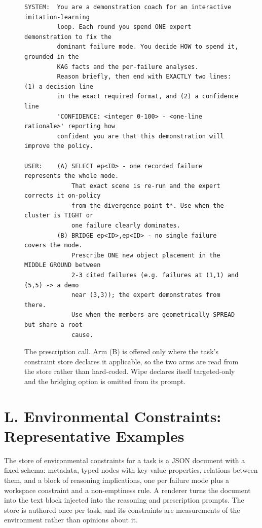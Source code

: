\documentclass[letterpaper]{article}
\begin{document}
\begin{figure}[t]
\centering
\begin{minipage}{\textwidth}
\begin{verbatim}
SYSTEM:  You are a demonstration coach for an interactive imitation-learning
         loop. Each round you spend ONE expert demonstration to fix the
         dominant failure mode. You decide HOW to spend it, grounded in the
         KAG facts and the per-failure analyses.
         Reason briefly, then end with EXACTLY two lines: (1) a decision line
         in the exact required format, and (2) a confidence line
         'CONFIDENCE: <integer 0-100> - <one-line rationale>' reporting how
         confident you are that this demonstration will improve the policy.

USER:    (A) SELECT ep<ID> - one recorded failure represents the whole mode.
             That exact scene is re-run and the expert corrects it on-policy
             from the divergence point t*. Use when the cluster is TIGHT or
             one failure clearly dominates.
         (B) BRIDGE ep<ID>,ep<ID> - no single failure covers the mode.
             Prescribe ONE new object placement in the MIDDLE GROUND between
             2-3 cited failures (e.g. failures at (1,1) and (5,5) -> a demo
             near (3,3)); the expert demonstrates from there.
             Use when the members are geometrically SPREAD but share a root
             cause.
\end{verbatim}
\end{minipage}
\caption{The prescription call. Arm (B) is offered only where the task's constraint
store declares it applicable, so the two arms are read from the store rather than
hard-coded. Wipe declares itself targeted-only and the bridging option is omitted from
its prompt.}
\label{fig:prompt-prescribe}
\end{figure}

\section{L. Environmental Constraints: Representative Examples}

The store of environmental constraints for a task is a JSON document with a fixed
schema: metadata, typed nodes with key-value properties, relations between them, and a
block of reasoning implications, one per failure mode plus a workspace constraint and a
non-emptiness rule. A renderer turns the document into the text block injected into the
reasoning and prescription prompts. The store is authored once per task, and its
constraints are measurements of the environment rather than opinions about it.
\end{document}
